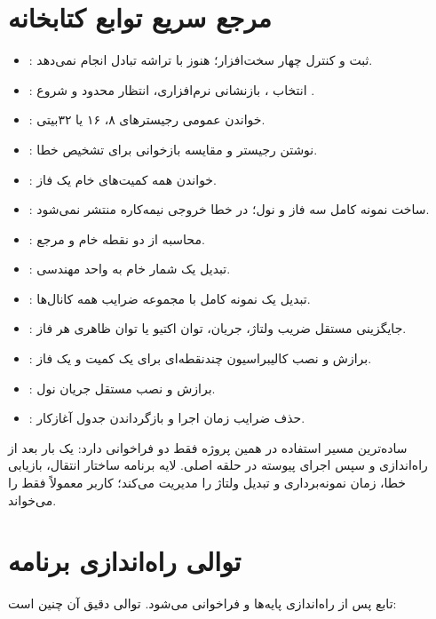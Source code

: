 \section{مرجع سریع توابع کتابخانه}
\begin{itemize}
  \item {}: ثبت و کنترل چهار  سخت‌افزار؛ هنوز با تراشه تبادل انجام نمی‌دهد.
  \item {}: انتخاب ، بازنشانی نرم‌افزاری، انتظار محدود و شروع .
  \item {}: خواندن عمومی رجیسترهای ۸، ۱۶ یا ۳۲بیتی.
  \item {}: نوشتن رجیستر و مقایسه بازخوانی برای تشخیص خطا.
  \item {}: خواندن همه کمیت‌های خام یک فاز.
  \item {}: ساخت نمونه کامل سه فاز و نول؛ در خطا خروجی نیمه‌کاره منتشر نمی‌شود.
  \item {}: محاسبه  از دو نقطه خام و مرجع.
  \item {}: تبدیل یک شمار خام به واحد مهندسی.
  \item {}: تبدیل یک نمونه کامل با مجموعه ضرایب همه کانال‌ها.
  \item {}: جایگزینی مستقل ضریب ولتاژ، جریان، توان اکتیو یا توان ظاهری هر فاز.
  \item {}: برازش و نصب کالیبراسیون چندنقطه‌ای برای یک کمیت و یک فاز.
  \item {}: برازش و نصب مستقل جریان نول.
  \item {}: حذف ضرایب زمان اجرا و بازگرداندن جدول آغازکار.
\end{itemize}

ساده‌ترین مسیر استفاده در همین پروژه فقط دو فراخوانی دارد: یک بار
بعد از راه‌اندازی  و سپس اجرای پیوسته
در حلقه اصلی. لایه برنامه ساختار انتقال، بازیابی خطا، زمان نمونه‌برداری و تبدیل ولتاژ را مدیریت می‌کند؛ کاربر معمولاً فقط
را می‌خواند.

\section{توالی راه‌اندازی برنامه}
تابع
پس از راه‌اندازی پایه‌ها و
فراخوانی می‌شود. توالی دقیق آن چنین است:

